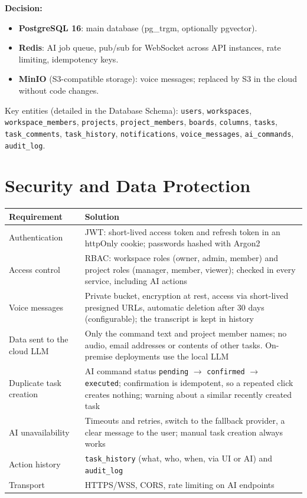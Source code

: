 \documentclass[11pt,a4paper]{article}
\newcommand{\tblstart}{\small\rowcolors{2}{gray!7}{white}}
\newcommand{\code}[1]{\texttt{#1}}
\begin{document}
\textbf{Decision:}
\begin{itemize}
  \item \textbf{PostgreSQL 16}: main database (pg\_trgm, optionally pgvector).
  \item \textbf{Redis}: AI job queue, pub/sub for WebSocket across API instances, rate limiting, idempotency keys.
  \item \textbf{MinIO} (S3-compatible storage): voice messages; replaced by S3 in the cloud without code changes.
\end{itemize}

Key entities (detailed in the Database Schema): \code{users}, \code{workspaces}, \code{workspace\_members}, \code{projects}, \code{project\_members}, \code{boards}, \code{columns}, \code{tasks}, \code{task\_comments}, \code{task\_history}, \code{notifications}, \code{voice\_messages}, \code{ai\_commands}, \code{audit\_log}.

\section{Security and Data Protection}

{\tblstart
\begin{xltabular}{\textwidth}{P{4cm} L}
\toprule
\textbf{Requirement} & \textbf{Solution} \\
\midrule
\endhead
Authentication & JWT: short-lived access token and refresh token in an httpOnly cookie; passwords hashed with Argon2 \\
Access control & RBAC: workspace roles (owner, admin, member) and project roles (manager, member, viewer); checked in every service, including AI actions \\
Voice messages & Private bucket, encryption at rest, access via short-lived presigned URLs, automatic deletion after 30 days (configurable); the transcript is kept in history \\
Data sent to the cloud LLM & Only the command text and project member names; no audio, email addresses or contents of other tasks. On-premise deployments use the local LLM \\
Duplicate task creation & AI command status \code{pending} $\rightarrow$ \code{confirmed} $\rightarrow$ \code{executed}; confirmation is idempotent, so a repeated click creates nothing; warning about a similar recently created task \\
AI unavailability & Timeouts and retries, switch to the fallback provider, a clear message to the user; manual task creation always works \\
Action history & \code{task\_history} (what, who, when, via UI or AI) and \code{audit\_log} \\
Transport & HTTPS/WSS, CORS, rate limiting on AI endpoints \\
\bottomrule
\end{xltabular}}
\end{document}
